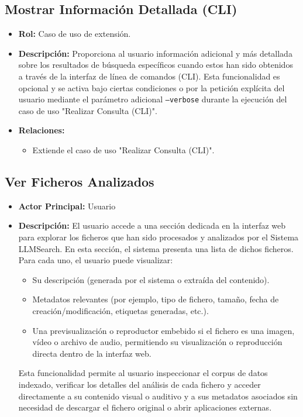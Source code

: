 \subsection{Mostrar Información Detallada (CLI)}
\begin{itemize}
\item \textbf{Rol:} Caso de uso de extensión.
\item \textbf{Descripción:} Proporciona al usuario información adicional y más detallada sobre los resultados de búsqueda específicos cuando estos han sido obtenidos a través de la interfaz de línea de comandos (CLI). Esta funcionalidad es opcional y se activa bajo ciertas condiciones o por la petición explícita del usuario mediante el parámetro adicional \texttt{--verbose} durante la ejecución del caso de uso "Realizar Consulta (CLI)".
\item \textbf{Relaciones:}
\begin{itemize}
\item Extiende el caso de uso "Realizar Consulta (CLI)".
\end{itemize}
\end{itemize}

\subsection{Ver Ficheros Analizados}
\begin{itemize}
\item \textbf{Actor Principal:} Usuario
\item \textbf{Descripción:} El usuario accede a una sección dedicada en la interfaz web para explorar los ficheros que han sido procesados y analizados por el Sistema LLMSearch. En esta sección, el sistema presenta una lista de dichos ficheros. Para cada uno, el usuario puede visualizar:
\begin{itemize}
\item Su descripción (generada por el sistema o extraída del contenido).
\item Metadatos relevantes (por ejemplo, tipo de fichero, tamaño, fecha de creación/modificación, etiquetas generadas, etc.).
\item Una previsualización o reproductor embebido si el fichero es una imagen, vídeo o archivo de audio, permitiendo su visualización o reproducción directa dentro de la interfaz web.
\end{itemize}
Esta funcionalidad permite al usuario inspeccionar el corpus de datos indexado, verificar los detalles del análisis de cada fichero y acceder directamente a su contenido visual o auditivo y a sus metadatos asociados sin necesidad de descargar el fichero original o abrir aplicaciones externas.
\end{itemize}

